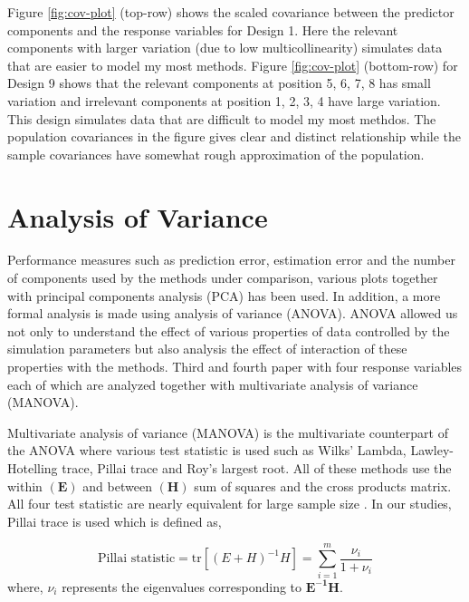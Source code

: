 \documentclass[11pt,twoside,openright,titlepage,
  headinclude,footinclude,BCOR=5mm,
  numbers=noenddot,cleardoublepage=empty,
  tablecaptionabove, dottedtoc,
  bibliography=totoc]{scrreprt}
\begin{document}
Figure \ref{fig:cov-plot} (top-row) shows the scaled covariance between the predictor components and the response variables for Design 1. Here the relevant components with larger variation (due to low multicollinearity) simulates data that are easier to model my most methods. Figure \ref{fig:cov-plot} (bottom-row) for Design 9 shows that the relevant components at position 5, 6, 7, 8 has small variation and irrelevant components at position 1, 2, 3, 4 have large variation. This design simulates data that are difficult to model my most methdos. The population covariances in the figure gives clear and distinct relationship while the sample covariances have somewhat rough approximation of the population.

\hypertarget{analysis-of-variance}{%
\section{Analysis of Variance}\label{analysis-of-variance}}

Performance measures such as prediction error, estimation error and the number of components used by the methods under comparison, various plots together with principal components analysis (PCA) has been used. In addition, a more formal analysis is made using analysis of variance (ANOVA). ANOVA allowed us not only to understand the effect of various properties of data controlled by the simulation parameters but also analysis the effect of interaction of these properties with the methods. Third and fourth paper with four response variables each of which are analyzed together with multivariate analysis of variance (MANOVA).

Multivariate analysis of variance (MANOVA) is the multivariate counterpart of the ANOVA where various test statistic is used such as Wilks' Lambda, Lawley-Hotelling trace, Pillai trace and Roy's largest root. All of these methods use the within \((\mathbf{E})\) and between \((\mathbf{H})\) sum of squares and the cross products matrix. All four test statistic are nearly equivalent for large sample size \citep{johnson2018applied}. In our studies, Pillai trace is used which is defined as,

\begin{equation}
\text{Pillai statistic} = \text{tr}\left[(E + H)^{-1}H\right] = \sum_{i=1}^{m}{\frac{\nu_i}{1+\nu_i}}
\label{eq:pillai}
\end{equation}
where, \(\nu_i\) represents the eigenvalues corresponding to \(\mathbf{E^{-1}H}\).
\end{document}
